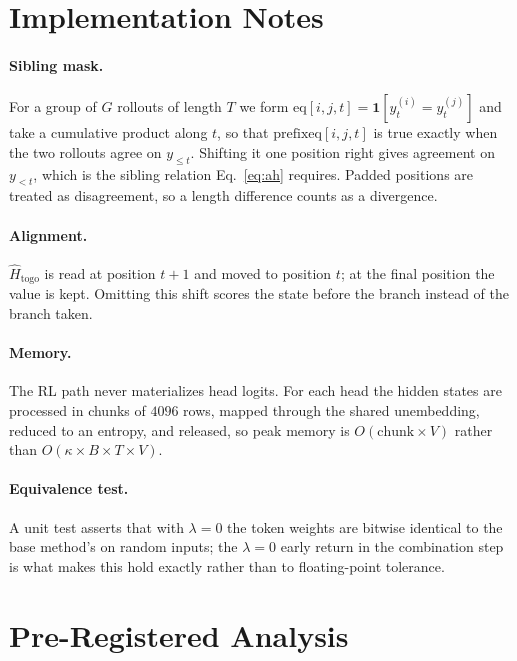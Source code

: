 \documentclass[11pt]{article}
\begin{document}
\section{Implementation Notes}
\label{sec:appendix-impl}

\paragraph{Sibling mask.} For a group of $G$ rollouts of length $T$ we form
$\mathrm{eq}[i,j,t] = \mathbf{1}[y^{(i)}_t = y^{(j)}_t]$ and take a cumulative
product along $t$, so that $\mathrm{prefixeq}[i,j,t]$ is true exactly when the two
rollouts agree on $y_{\le t}$. Shifting it one position right gives agreement on
$y_{<t}$, which is the sibling relation Eq.~\eqref{eq:ah} requires. Padded positions
are treated as disagreement, so a length difference counts as a divergence.

\paragraph{Alignment.} $\hat{H}_{\mathrm{togo}}$ is read at position $t+1$ and moved
to position $t$; at the final position the value is kept. Omitting this shift scores
the state before the branch instead of the branch taken.

\paragraph{Memory.} The RL path never materializes head logits. For each head the
hidden states are processed in chunks of $4096$ rows, mapped through the shared
unembedding, reduced to an entropy, and released, so peak memory is
$O(\text{chunk} \times V)$ rather than $O(\kappa \times B \times T \times V)$.

\paragraph{Equivalence test.} A unit test asserts that with $\lambda = 0$ the token
weights are bitwise identical to the base method's on random inputs; the
$\lambda = 0$ early return in the combination step is what makes this hold exactly
rather than to floating-point tolerance.

\section{Pre-Registered Analysis}
\label{sec:appendix-prereg}
\end{document}
